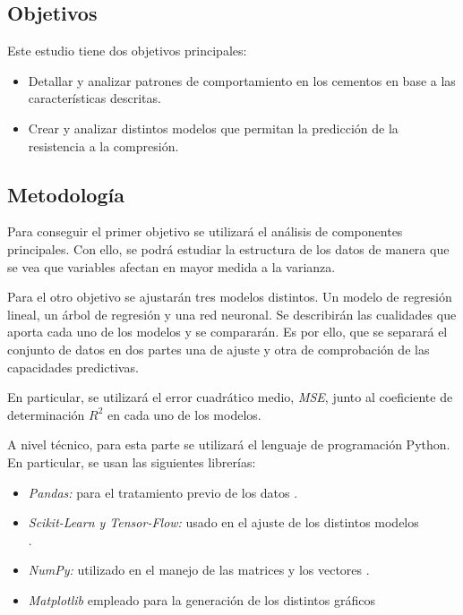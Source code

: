 \subsection*{Objetivos}

\noindent Este estudio tiene dos objetivos principales:
\begin{itemize}
\item Detallar y analizar patrones de comportamiento en los cementos en base a las características descritas. 
\item Crear y analizar distintos modelos que permitan la predicción de la resistencia a la compresión. 
\end{itemize}

\subsection*{Metodología}

\noindent Para conseguir el primer objetivo se utilizará el análisis de componentes principales. Con ello, se podrá estudiar la estructura de los datos de manera que se vea que variables afectan en mayor medida a la varianza. 

\noindent Para el otro objetivo se ajustarán   tres modelos distintos. Un modelo de regresión lineal, un árbol de regresión y una red neuronal. Se describirán las cualidades que aporta cada uno de los modelos y se compararán. Es por ello,  que se separará el conjunto de datos en dos partes una de ajuste y otra de comprobación de las capacidades predictivas. 

\noindent En particular, se utilizará el error cuadrático medio, \emph{MSE}, junto al coeficiente de determinación $R^2$ en cada uno de los modelos. 

\noindent A nivel técnico, para esta parte se utilizará el lenguaje de programación Python. En particular, se usan las siguientes librerías:
\begin{itemize}
\item \emph{Pandas:} para el tratamiento previo de los datos \cite{Pandas}. 
\item \emph{Scikit-Learn y Tensor-Flow:} usado en el ajuste de los distintos modelos \\ \cite{Scikit-Learn, TensorFlow}. 
\item \emph{NumPy:} utilizado en el manejo de las matrices y los vectores \cite{Numpy}. 
\item \emph{Matplotlib} empleado para la generación de los distintos gráficos \cite{Matplotlib}
\end{itemize}

